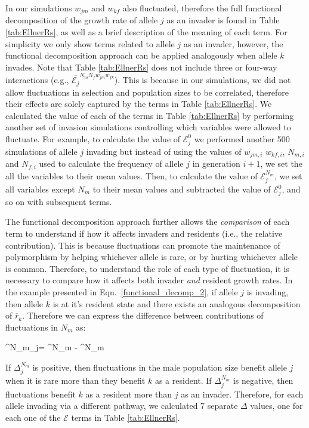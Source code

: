 \documentclass[12pt]{article}
\let\oldequation\equation
\let\oldendequation\endequation
\renewenvironment{equation}
  {\linenomathNonumbers\oldequation}
  {\oldendequation\endlinenomath}
\begin{document}
In our simulations $w_{jm}$ and $w_{kf}$ also fluctuated, therefore the full functional decomposition of the growth rate of allele $j$ as an invader is found in Table \ref{tab:EllnerRs}, as well as a brief description of the meaning of each term. For simplicity we only show terms related to allele $j$ as an invader, however, the functional decomposition approach can be applied analogously when allele $k$ invades. Note that Table \ref{tab:EllnerRs} does not include three or four-way interactions (e.g., $\overline{\mathcal{E}_{j}}^{N_{m}N_{f}w_{jm}w_{fk}}$). This is because in our simulations, we did not allow fluctuations in selection and population sizes to be correlated, therefore their effects are solely captured by the terms in Table \ref{tab:EllnerRs}. We calculated the value of each of the terms in Table \ref{tab:EllnerRs} by performing another set of invasion simulations controlling which variables were allowed to fluctuate. For example, to calculate the value of $\mathcal{E}_{j}^{0}$ we performed another 500 simulations of allele $j$ invading but instead of using the values of $w_{jm,i}$ $w_{kf,i}$, $N_{m,i}$ and $N_{f,i}$ used to calculate the frequency of allele $j$ in generation $i+1$, we set the all the variables to their mean values. Then, to calculate the value of $\mathcal{E}_{j}^{N_{m}}$, we set all variables except  $N_{m}$ to their mean values and subtracted the value of $\mathcal{E}_{j}^{0}$, and so on with subsequent terms.

The functional decomposition approach further allows the \textit{comparison} of each term to understand if how it affects invaders and residents (i.e., the relative contribution). This is because fluctuations can promote the maintenance of polymorphism by helping whichever allele is rare, or by hurting whichever allele is common. Therefore, to understand the role of each type of fluctuation, it is necessary to compare how it affects both invader \textit{and} resident growth rates. In the example presented in Eqn.~\ref{functional_decomp_2}, if allele $j$ is invading, then allele $k$ is at it's resident state and there exists an analogous decomposition of $\overline{r}_{k}$. Therefore we can express the difference between contributions of fluctuations in $N_{m}$ as:


\begin{equation}
\Delta^{N_{m}}_{j}= ^{N_{m}} - ^{N_{m}}
\label{delta}
\end{equation}

If $\Delta^{N_{m}}_{j}$ is positive, then fluctuations in the male population size benefit allele $j$ when it is rare more than they benefit $k$ as a resident. If $\Delta^{N_{m}}_{j}$ is negative, then fluctuations benefit $k$ as a resident more than $j$ as an invader. Therefore, for each allele invading via a different pathway, we calculated 7 separate $\Delta$ values, one for each one of the $\mathcal{E}$ terms in Table \ref{tab:EllnerRs}.
\end{document}
